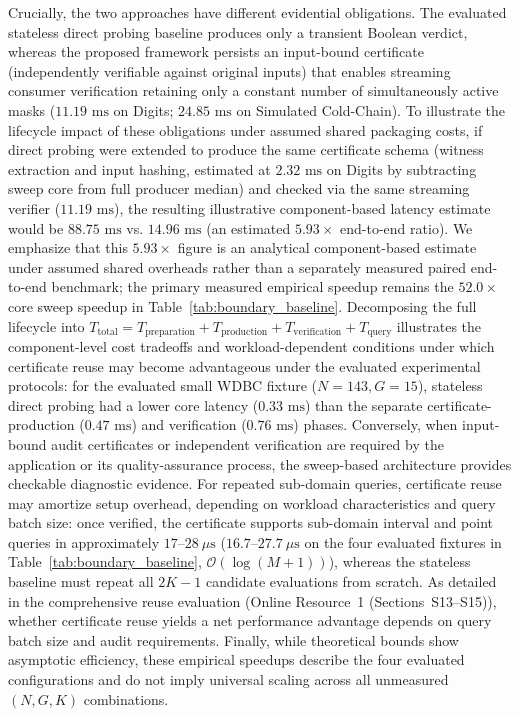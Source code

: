 \documentclass[11pt,a4paper]{article}
\begin{document}
Crucially, the two approaches have different evidential obligations. The evaluated stateless direct probing baseline produces only a transient Boolean verdict, whereas the proposed framework persists an input-bound certificate (independently verifiable against original inputs) that enables streaming consumer verification retaining only a constant number of simultaneously active masks ($11.19\text{ ms}$ on Digits; $24.85\text{ ms}$ on Simulated Cold-Chain). To illustrate the lifecycle impact of these obligations under assumed shared packaging costs, if direct probing were extended to produce the same certificate schema (witness extraction and input hashing, estimated at $2.32\text{ ms}$ on Digits by subtracting sweep core from full producer median) and checked via the same streaming verifier ($11.19\text{ ms}$), the resulting illustrative component-based latency estimate would be $88.75\text{ ms}$ vs. $14.96\text{ ms}$ (an estimated $5.93\times$ end-to-end ratio). We emphasize that this $5.93\times$ figure is an analytical component-based estimate under assumed shared overheads rather than a separately measured paired end-to-end benchmark; the primary measured empirical speedup remains the $52.0\times$ core sweep speedup in Table~\ref{tab:boundary_baseline}. Decomposing the full lifecycle into $T_{\text{total}} = T_{\text{preparation}} + T_{\text{production}} + T_{\text{verification}} + T_{\text{query}}$ illustrates the component-level cost tradeoffs and workload-dependent conditions under which certificate reuse may become advantageous under the evaluated experimental protocols: for the evaluated small WDBC fixture ($N = 143, G = 15$), stateless direct probing had a lower core latency ($0.33\text{ ms}$) than the separate certificate-production ($0.47\text{ ms}$) and verification ($0.76\text{ ms}$) phases. Conversely, when input-bound audit certificates or independent verification are required by the application or its quality-assurance process, the sweep-based architecture provides checkable diagnostic evidence. For repeated sub-domain queries, certificate reuse may amortize setup overhead, depending on workload characteristics and query batch size: once verified, the certificate supports sub-domain interval and point queries in approximately $17\text{--}28\ \mu\text{s}$ ($16.7\text{--}27.7\ \mu\text{s}$ on the four evaluated fixtures in Table~\ref{tab:boundary_baseline}, $\mathcal{O}(\log(M+1))$), whereas the stateless baseline must repeat all $2K-1$ candidate evaluations from scratch. As detailed in the comprehensive reuse evaluation (Online Resource~1 (Sections~S13--S15)), whether certificate reuse yields a net performance advantage depends on query batch size and audit requirements. Finally, while theoretical bounds show asymptotic efficiency, these empirical speedups describe the four evaluated configurations and do not imply universal scaling across all unmeasured $(N, G, K)$ combinations.
\end{document}
